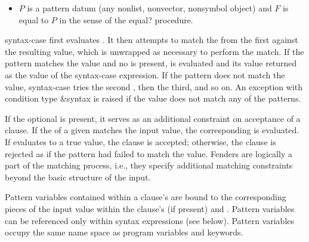 \begin{entry}{%
}
\begin{itemize}
\item $P$ is a pattern datum (any nonlist, nonvector, nonsymbol
object) and $F$ is equal to $P$ in the sense of the
{\cf equal?} procedure.
\end{itemize}

\semantics
{\cf syntax-case} first evaluates .
It then attempts to match
the  from the first  against the resulting value,
which is unwrapped as necessary to perform the match.
If the pattern matches the value and no
 is present,
 is evaluated and its value returned as the
value of the {\cf syntax-case} expression.
If the pattern does not match the value, {\cf syntax-case} tries
the second , then the third, and so on.
An exception with condition type {\cf\&syntax} is raised if the value does not match any of the patterns.

If the optional  is present, it serves as an additional
constraint on acceptance of a clause.
If the  of a given  matches the input value,
the corresponding  is evaluated.
If  evaluates to a true value, the clause is accepted;
otherwise, the clause is rejected as if the pattern had failed to match
the value.
Fenders are logically a part of the matching process, i.e., they
specify additional matching constraints beyond the basic structure of
the input.

Pattern variables contained within a clause's
 are bound to the corresponding pieces of the input
value within the clause's  (if present) and
.
Pattern variables can be referenced only within {\cf syntax}
expressions (see below).
Pattern variables occupy the same name space as program variables and
keywords.
\end{entry}

